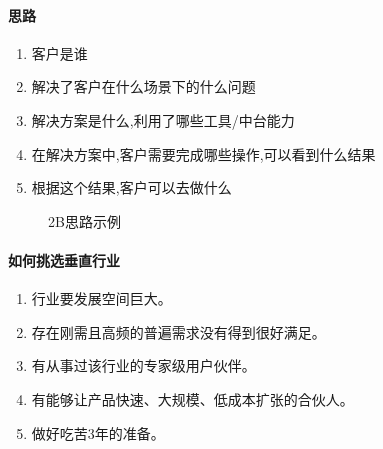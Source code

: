 \documentclass[letterpaper,10pt,english]{sphinxmanual}
\begin{document}
\paragraph{思路}
\label{\detokenize{chapter_introduction/2B:id30}}\begin{enumerate}
%
\item {} 
客户是谁

\item {} 
解决了客户在什么场景下的什么问题

\item {} 
解决方案是什么,利用了哪些工具/中台能力

\item {} 
在解决方案中,客户需要完成哪些操作,可以看到什么结果

\item {} 
根据这个结果,客户可以去做什么

\end{enumerate}

\begin{figure}[H]
\centering
\capstart

\noindent{}
\caption{2B思路示例}\label{\detokenize{chapter_introduction/2B:id42}}\end{figure}


\paragraph{如何挑选垂直行业}
\label{\detokenize{chapter_introduction/2B:id31}}\begin{enumerate}
%
\item {} 
行业要发展空间巨大。

\item {} 
存在刚需且高频的普遍需求没有得到很好满足。

\item {} 
有从事过该行业的专家级用户伙伴。

\item {} 
有能够让产品快速、大规模、低成本扩张的合伙人。

\item {} 
做好吃苦3年的准备。%
\begin{footnote}[88]\sphinxAtStartFootnote
{}
%
\end{footnote}

\end{enumerate}
\end{document}
